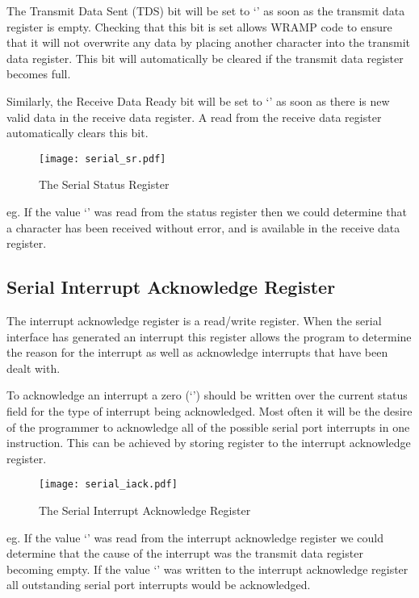 The Transmit Data Sent (TDS) bit will be set to `' as soon
as the transmit data register is empty. Checking that this bit is set
allows WRAMP code to ensure that it will not overwrite any data by
placing another character into the transmit data register. This bit
will automatically be cleared if the transmit data register becomes
full.

Similarly, the Receive Data Ready bit will be set to `' as soon
as there is new valid data in the receive data register. A read from
the receive data register automatically clears this bit.

\begin{figure}[h]
\begin{center}
\texttt{[image: serial\_sr.pdf]}
\caption{The Serial Status Register}
\label{serial_sr_pic}
\end{center}
\end{figure}

\noindent
eg. If the value `' was read from the status register
then we could determine that a character has been received without
error, and is available in the receive data register.

\subsection{Serial Interrupt Acknowledge Register}

The interrupt acknowledge register is a read/write register. When the
serial interface has generated an interrupt this register allows the
program to determine the reason for the interrupt as well as
acknowledge interrupts that have been dealt with.

To acknowledge an interrupt a zero (`') should be written
over the current status field for the type of interrupt being
acknowledged. Most often it will be the desire of the programmer to
acknowledge all of the possible serial port interrupts in one
instruction. This can be achieved by storing register  to
the interrupt acknowledge register.

\begin{figure}[h]
\begin{center}
\texttt{[image: serial\_iack.pdf]}
\caption{The Serial Interrupt Acknowledge Register}
\label{serial_iack_pic}
\end{center}
\end{figure}

\noindent
eg. If the value `' was read from the interrupt
acknowledge register we could determine that the cause of the
interrupt was the transmit data register becoming empty. If the value
`' was written to the interrupt acknowledge register all
outstanding serial port interrupts would be acknowledged.

